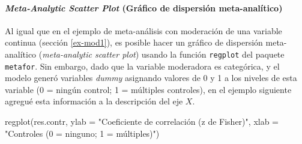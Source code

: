 \documentclass[
  bookmarksnumbered]{article}
\newenvironment{Shaded}{\begin{snugshade}}{\end{snugshade}}
\newcommand{\AttributeTok}[1]{\textcolor[rgb]{0.00,0.34,0.68}{#1}}
\newcommand{\FunctionTok}[1]{\textcolor[rgb]{0.39,0.29,0.61}{#1}}
\newcommand{\NormalTok}[1]{\textcolor[rgb]{0.12,0.11,0.11}{#1}}
\newcommand{\StringTok}[1]{\textcolor[rgb]{0.75,0.01,0.01}{#1}}
\begin{document}
\hypertarget{meta-scatter2}{%
\paragraph{\texorpdfstring{\emph{Meta-Analytic Scatter Plot} (Gráfico de dispersión meta-analítico)}{Meta-Analytic Scatter Plot (Gráfico de dispersión meta-analítico)}}\label{meta-scatter2}}

Al igual que en el ejemplo de meta-análisis con moderación de una variable continua (sección \ref{ex-mod1}), es posible hacer un gráfico de dispersión meta-analítico (\emph{meta-analytic scatter plot}) usando la función \texttt{regplot} del paquete \texttt{metafor}. Sin embargo, dado que la variable moderadora es categórica, y el modelo generó variables \emph{dummy} asignando valores de 0 y 1 a los niveles de esta variable (0 = ningún control; 1 = múltiples controles), en el ejemplo siguiente agregué esta información a la descripción del eje \(X\).

\begin{Shaded}
\begin{Highlighting}[]
\FunctionTok{regplot}\NormalTok{(res.contr,}
        \AttributeTok{ylab =} \StringTok{"Coeficiente de correlación (z de Fisher)"}\NormalTok{,}
        \AttributeTok{xlab =} \StringTok{"Controles (0 = ninguno; 1 = múltiples)"}\NormalTok{)}
\end{Highlighting}
\end{Shaded}
\end{document}
